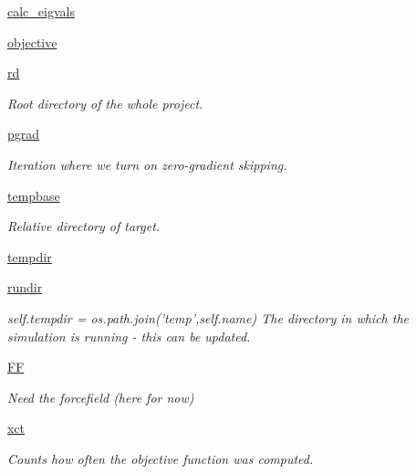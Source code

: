 \begin{DoxyCompactItemize}
\item 
\hyperlink{classforcebalance_1_1vibration_1_1Vibration_a465150971ac24aabbf40b1f50b304f6e}{calc\-\_\-eigvals}
\item 
\hyperlink{classforcebalance_1_1vibration_1_1Vibration_a78813cc16da8d8c6a8113e3301c96c0d}{objective}
\item 
\hyperlink{classforcebalance_1_1target_1_1Target_a4edb69fbde792e9f2f27e54b7c978c8e}{rd}
\begin{DoxyCompactList}\small\item\em Root directory of the whole project. \end{DoxyCompactList}\item 
\hyperlink{classforcebalance_1_1target_1_1Target_a684235b4332b608c4e2da22982c2fdfa}{pgrad}
\begin{DoxyCompactList}\small\item\em Iteration where we turn on zero-\/gradient skipping. \end{DoxyCompactList}\item 
\hyperlink{classforcebalance_1_1target_1_1Target_ae5b544d3e11365865813ef3d626ef81d}{tempbase}
\begin{DoxyCompactList}\small\item\em Relative directory of target. \end{DoxyCompactList}\item 
\hyperlink{classforcebalance_1_1target_1_1Target_aa1f01b5b78db253b5b66384ed11ed193}{tempdir}
\item 
\hyperlink{classforcebalance_1_1target_1_1Target_a6872de5b2d4273b82336ea5b0da29c9e}{rundir}
\begin{DoxyCompactList}\small\item\em self.\-tempdir = os.\-path.\-join('temp',self.\-name) The directory in which the simulation is running -\/ this can be updated. \end{DoxyCompactList}\item 
\hyperlink{classforcebalance_1_1target_1_1Target_a38a37919783141ea37fdcf8b00ce0aaf}{F\-F}
\begin{DoxyCompactList}\small\item\em Need the forcefield (here for now) \end{DoxyCompactList}\item 
\hyperlink{classforcebalance_1_1target_1_1Target_aad2e385cfbf7b4a68f1c2cb41133fe82}{xct}
\begin{DoxyCompactList}\small\item\em Counts how often the objective function was computed. \end{DoxyCompactList}\item 

\end{DoxyCompactItemize}
